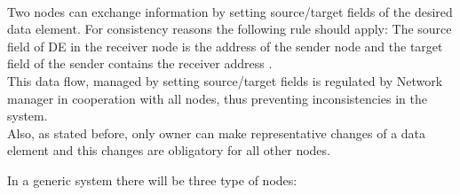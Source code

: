 \\
Two nodes can exchange information by setting source/target fields
of the desired data element. For consistency reasons the following
rule should apply: The source field of DE in the receiver node is
the address of the sender node and the target field of the sender
contains the receiver address . \\
This data flow, managed by setting source/target fields is regulated
by Network manager in cooperation with all nodes, thus preventing
inconsistencies in the system.\\
Also, as stated before, only owner can make representative changes
of a data element and this changes are obligatory for all other nodes.

In a generic system there will be three type of nodes:

